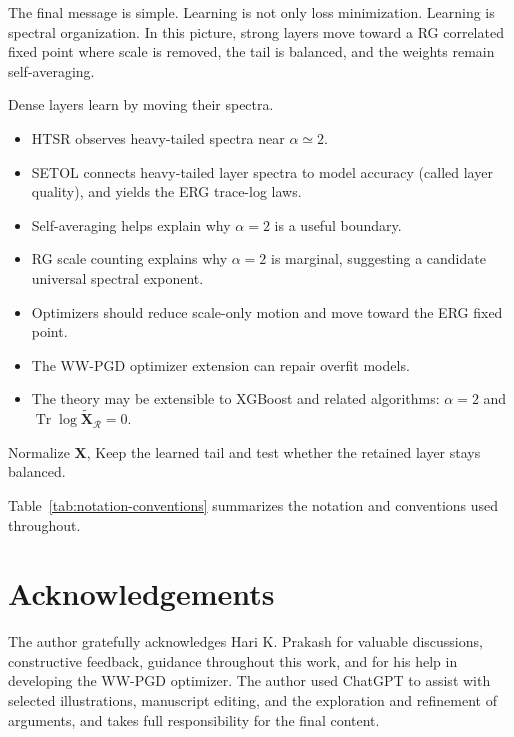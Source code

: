 \documentclass[10pt,twocolumn]{article}
\newcommand{\Tr}{\operatorname{Tr}}
\newcommand{\X}{\mathbf X}
\newcommand{\Xtilde}{\widetilde{\mathbf X}}
\newcommand{\Rell}{\mathcal R}
\newcommand{\takeaway}[1]{%
  \par\vspace{4pt}\noindent\textcolor{boxblue}{#1}%
}
\begin{document}
The final message is simple. Learning is not only loss minimization. Learning is spectral organization.
In this picture, strong layers move toward a RG correlated fixed point where scale is removed, the tail is balanced, and the
weights remain self-averaging.


\begin{tcolorbox}[marginalbox,title=\textbf{The theory in one pass}]
Dense layers learn by moving their spectra.
\begin{itemize}
\item HTSR observes heavy-tailed spectra near $\alpha\simeq2$.
\item SETOL connects heavy-tailed layer spectra to model accuracy (called layer quality), and yields the ERG trace-log laws.
\item Self-averaging helps explain why $\alpha=2$ is a useful boundary.
\item RG scale counting explains why $\alpha=2$ is marginal, suggesting a candidate universal spectral exponent.
\item Optimizers should reduce scale-only motion and move toward the ERG fixed point.
\item The WW-PGD optimizer extension can repair overfit models.
\item The theory may be extensible to XGBoost and related algorithms:
  $\alpha=2$ and $\Tr{\log\Xtilde_{\Rell}}=0$.
\end{itemize}
\takeaway{Normalize $\X$, Keep the learned tail and test whether the retained layer stays balanced.}
\end{tcolorbox}

Table~\ref{tab:notation-conventions} summarizes the notation and conventions used throughout.

\section*{Acknowledgements}

The author gratefully acknowledges Hari K. Prakash for valuable discussions, constructive feedback, guidance throughout this work, and for his help in developing the WW-PGD optimizer.  The author used ChatGPT to assist with selected illustrations, manuscript editing, and the exploration and refinement of arguments, and takes full responsibility for the final content.
\end{document}
